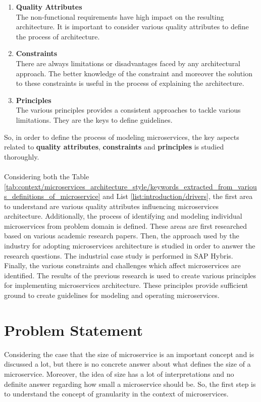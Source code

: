 \begin{enumerate}
\item \textbf{Quality Attributes}\\
The non-functional requirements have high impact on the resulting architecture. It is important to consider various quality attributes to define the process of architecture.
\item \textbf{Constraints}\\
There are always limitations or disadvantages faced by any architectural approach.  The better knowledge of the constraint and moreover the solution to these constraints is useful in the process of explaining the architecture.
\item \textbf{Principles}\\
The various principles provides a consistent approaches to tackle various limitations. They are the keys to define guidelines.
\end{enumerate}
So, in order to define the process of modeling microservices, the key aspects related to \textbf{quality attributes}, \textbf{constraints} and \textbf{principles} is studied thoroughly.
\\
\\
Considering both the Table \ref{tab:context/microservices_architecture_style/keywords_extracted_from_various_definitions_of_microservice} and List \ref{list:introduction/drivers}, the first area to understand are various quality attributes influencing microservices architecture. Additionally, the process of identifying and modeling individual microservices from problem domain is defined. These areas are first researched based on various academic research papers. Then, the approach used by the industry for adopting microservices architecture is studied in order to answer the research questions. The industrial case study is performed in SAP Hybris.
Finally, the various constraints and challenges which affect microservices are identified. 
The results of the previous research is used to create various principles for implementing microservices architecture. These principles provide sufficient ground to create guidelines for modeling and operating microservices.

\section{Problem Statement}\label{section:context/problem_statement}
Considering the case that the size of microservice is an important concept and is discussed a lot, but there is no concrete answer about what defines the size of a microservice. Moreover, the idea of size has a lot of interpretations and no definite answer regarding how small a microservice should be. So, the first step is to understand the concept of granularity in the context of microservices.